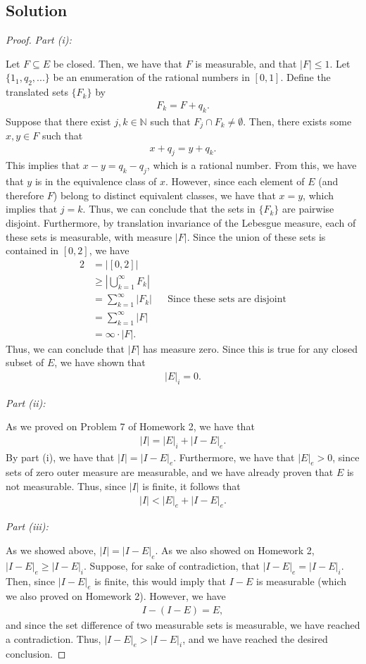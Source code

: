 \documentclass[10pt,a4paper]{article}
\makeatletter
\theoremstyle{theorem}
\newcommand{\proofpart}[2]{%
  \par
  \addvspace{\medskipamount}%
  \noindent\emph{Part #1: #2}\par\nobreak
  \addvspace{\smallskipamount}%
  \@afterheading
}
\theoremstyle{definition}
\makeatother
\begin{document}
\subsection*{Solution}
\begin{proof}
\proofpart{(i)}{}
Let $F \subseteq E$ be closed. Then, we have that $F$ is measurable, and that $|F| \leq 1$. Let $\{1_1, q_2,...\}$ be an enumeration of the rational numbers in $[0, 1]$. Define the translated sets $\{F_k\}$ by 
\begin{align*}
F_k = F + q_k.
\end{align*}
Suppose that there exist $j,k \in \mathbb{N}$ such that $F_j \cap F_k \not= \emptyset$. Then, there exists some $x,y \in F$ such that 
\begin{align*}
x + q_j = y + q_k.
\end{align*}
This implies that $x - y = q_k - q_j$, which is a rational number. From this, we have that $y$ is in the equivalence class of $x$. However, since each element of $E$ (and therefore $F$) belong to distinct equivalent classes, we have that $x = y$, which implies that $j = k$. Thus, we can conclude that the sets in $\{F_k\}$ are pairwise disjoint. Furthermore, by translation invariance of the Lebesgue measure, each of these sets is measurable, with measure $|F|$. Since the union of these sets is contained in $[0, 2]$, we have
\begin{align*}
2 &= |[0, 2]|\\
&\geq \left| \bigcup_{k = 1}^\infty F_k \right|\\
&= \sum_{k=1}^\infty |F_k| &&\text{Since these sets are disjoint}\\
&= \sum_{k=1}^\infty |F|\\
&= \infty \cdot |F|.
\end{align*}
Thus, we can conclude that $|F|$ has measure zero. Since this is true for any closed subset of $E$, we have shown that 
\begin{align*}
|E|_i = 0.
\end{align*}
\proofpart{(ii)}{}
As we proved on Problem 7 of Homework 2, we have that
\begin{align*}
|I| = |E|_i + |I - E|_e.
\end{align*}
By part (i), we have that $|I| = |I - E|_e$. Furthermore,  we have that $|E|_e > 0$, since sets of zero outer measure are measurable, and we have already proven that $E$ is not measurable. Thus, since $|I|$ is finite, it follows that 
\begin{align*}
|I| < |E|_e + |I - E|_e.
\end{align*}

\proofpart{(iii)}{}
As we showed above, $|I| = |I - E|_e$. As we also showed on Homework 2, $|I - E|_e \geq |I - E|_i$.  Suppose, for sake of contradiction, that $|I - E|_e = |I - E|_i$. Then, since $|I - E|_e$ is finite, this would imply that $I - E$ is measurable (which we also proved on Homework 2). However, we have
\begin{align*}
I - (I - E) = E,
\end{align*}
and since the set difference of two measurable sets is measurable, we have reached a contradiction. Thus, $|I - E|_e > |I - E|_i$, and we have reached the desired conclusion.
\end{proof}
\end{document}
